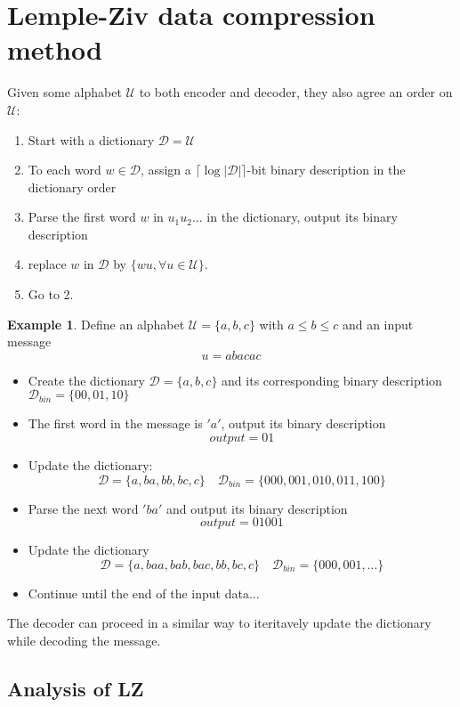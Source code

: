 \documentclass[twoside]{article}
\theoremstyle{definition} %
\newtheorem{example}{Example}
\def\D{\mathcal{D}}
\def\U{\mathcal{U}}
\begin{document}


\cleardoublepage
\section{Lemple-Ziv data compression method}

Given some alphabet $\U$ to both encoder and decoder, they also agree an order on $\U$:

\begin{enumerate}
  \item Start with a dictionary $\D = \U$
  \item To each word $w \in \D$, assign a $\lceil \log |\D| \rceil $-bit binary description in the dictionary order
  \item Parse the first word $w$ in $u_1 u_2 ...$ in the dictionary, output its binary description
  \item replace $w$ in $\D$ by $\{ wu, \forall u \in \U \}$.
  \item Go to 2.
\end{enumerate}

\begin{example}
  Define an alphabet $\U = \{a, b, c\}$ with $a \leq b \leq c$ and an input message
  $$ u = a b a c a c $$
  \begin{itemize}
    \item Create the dictionary $\D = \{a, b, c\}$ and its corresponding binary description $\D_{bin} = \{00, 01, 10\}$
    \item The first word in the message is $'a'$, output its binary description
    $$ output = 01 $$
    \item Update the dictionary:
    $$ \D = \{a, ba, bb, bc , c\} \quad \D_{bin} = \{000, 001, 010, 011, 100\} $$
    \item Parse the next word $'ba'$ and output its binary description
    $$ output = 01 001 $$
    \item Update the dictionary
    $$ \D = \{a, baa, bab, bac, bb, bc , c\} \quad \D_{bin} = \{000, 001, ...\} $$
    \item Continue until the end of the input data...
  \end{itemize}
  The decoder can proceed in a similar way to iteritavely update the dictionary while decoding the message.
\end{example}

\subsection{Analysis of LZ}
\end{document}
